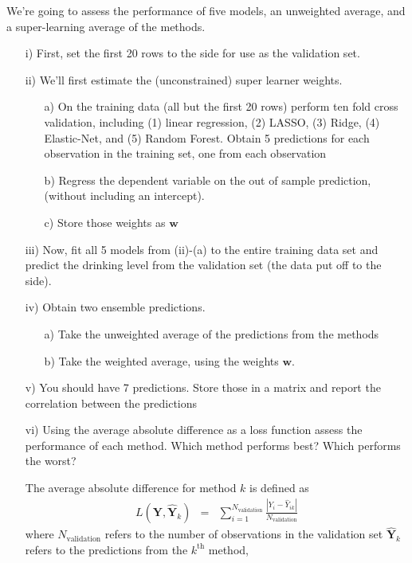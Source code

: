 \documentclass[12pt,letterpaper]{article}
\begin{document}
We're going to assess the performance of five models, an unweighted average, and a super-learning average of the methods.

\begin{itemize}
\item[i)] First, set the first 20 rows to the side for use as the validation set.
\item[ii)] We'll first estimate the (unconstrained) super learner weights.
\begin{itemize}
\item[a)] On the training data (all but the first 20 rows) perform ten fold cross validation, including (1) linear regression, (2) LASSO, (3) Ridge, (4) Elastic-Net, and (5) Random Forest.  Obtain 5 predictions for each observation in the training set, one from each observation
\item[b)] Regress the dependent variable on the out of sample prediction, (without including an intercept).
\item[c)] Store those weights as $\boldsymbol{w}$
\end{itemize}
\item[iii)] Now, fit all 5 models from (ii)-(a) to the entire training data set and predict the drinking level from the validation set (the data put off to the side).
\item[iv)]   Obtain two ensemble predictions.
\begin{itemize}
\item[a)] Take the unweighted average of the predictions from the methods
\item[b)] Take the weighted average, using the weights $\boldsymbol{w}$.
\end{itemize}
\item[v)] You should have 7 predictions. Store those in a matrix and report the correlation between the predictions
\item[vi)] Using the average absolute difference as a loss function assess the performance of each method.  Which method performs best?  Which performs the worst?

\noindent The average absolute difference for method $k$ is defined as
\begin{eqnarray}
L(\boldsymbol{Y}, \widehat{\boldsymbol{Y}}_{k}) & = & \sum_{i=1}^{N_{\text{validation}}} \frac{|Y_{i} - \widehat{Y}_{ik}| }{ N_{\text{validation}} }\nonumber
\end{eqnarray}
where $N_{\text{validation}}$ refers to the number of observations in the validation set $\widehat{\boldsymbol{Y}}_{k}$ refers to the predictions from the $k^{\text{th}}$ method,


\end{itemize}
\end{document}
